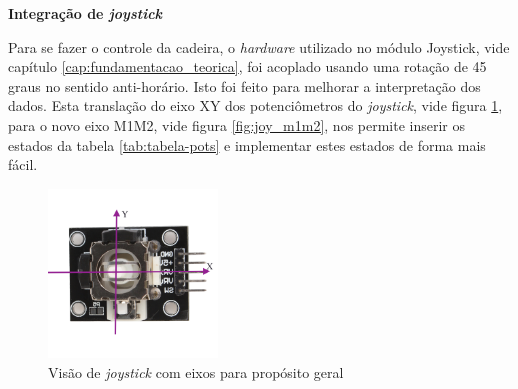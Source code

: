     \begin{table}[!ht]
    \centering
    \caption{Intensidade e direção dos motores conforme estado. Asteriscos simbolizam motor sem direção}
    \label{tab:tabela-pots2}
    \end{table}

    \textbf{Integração de \textit{joystick}}

	Para se fazer o controle da cadeira, o \textit{hardware} utilizado no módulo Joystick, vide capítulo \ref{cap:fundamentacao_teorica}, foi acoplado usando uma rotação de 45 graus no sentido anti-horário. Isto foi feito para melhorar a interpretação dos dados. Esta translação do eixo XY dos potenciômetros do \textit{joystick}, vide figura \ref{fig:joy_superior}, para o novo eixo M1M2, vide figura \ref{fig:joy_m1m2}, nos permite inserir os estados da tabela \ref{tab:tabela-pots} e implementar estes estados de forma mais fácil.

    \begin{figure}[!ht]
      \center
      \includegraphics[width=0.4\textwidth]{figuras/resultados/joy_xy}
      \caption{Visão de \textit{joystick} com eixos para propósito geral}
      \label{fig:joy_superior}
    \end{figure}

